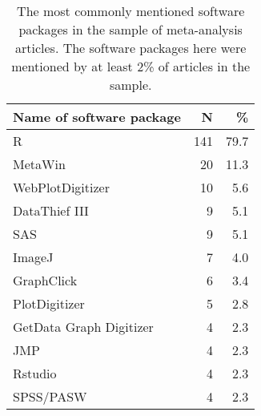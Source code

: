\begin{table}[ht]
\centering
\begin{tabular}{lrr}
  \hline
Name of software package & N & \% \\ 
  \hline
R & 141 & 79.7 \\ 
  MetaWin & 20 & 11.3 \\ 
  WebPlotDigitizer & 10 & 5.6 \\ 
  DataThief III & 9 & 5.1 \\ 
  SAS & 9 & 5.1 \\ 
  ImageJ & 7 & 4.0 \\ 
  GraphClick & 6 & 3.4 \\ 
  PlotDigitizer & 5 & 2.8 \\ 
  GetData Graph Digitizer & 4 & 2.3 \\ 
  JMP & 4 & 2.3 \\ 
  Rstudio & 4 & 2.3 \\ 
  SPSS/PASW & 4 & 2.3 \\ 
   \hline
\end{tabular}
\caption{The most commonly mentioned software packages in the sample of meta-analysis articles. The software packages here were mentioned by at least 2\% of articles in the sample.} 
\label{tab:ma_res_top_software_mentions}
\end{table}
